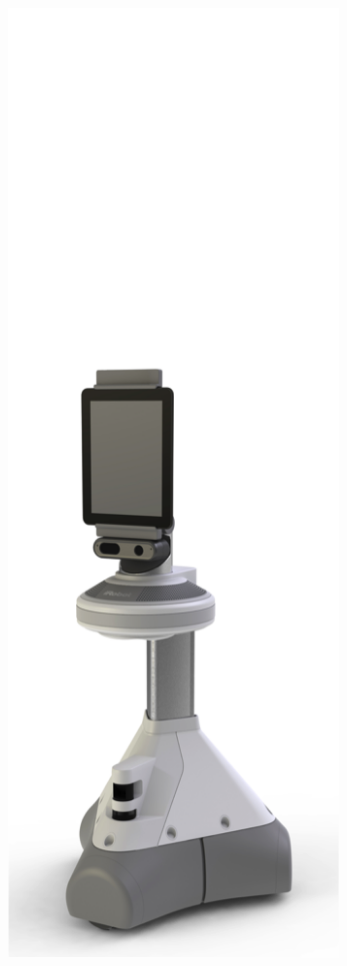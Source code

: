 \begin{figure}[ht]
\begin{minipage}[t]{.25\linewidth}
      \label{fig:w} 
   \end{minipage}%
   \hfill
   \begin{minipage}[t]{.25\linewidth} 
      \centering 
      \includegraphics[width=0.78\textwidth]{bilder/grundlagen/2.png} 

\end{minipage}
\end{figure}
